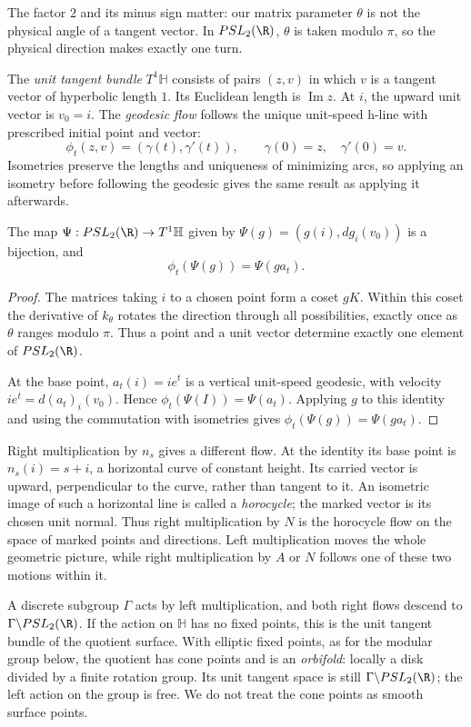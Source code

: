 The factor $2$ and its minus sign matter: our matrix parameter $\theta$ is not the physical angle of a tangent vector. In $PSL_2(\R)$, $\theta$ is taken modulo $\pi$, so the physical direction makes exactly one turn.

The \emph{unit tangent bundle} $T^1\mathbb H$ consists of pairs $(z,v)$ in which $v$ is a tangent vector of hyperbolic length $1$. Its Euclidean length is $\operatorname{Im}z$. At $i$, the upward unit vector is $v_0=i$. The \emph{geodesic flow} follows the unique unit-speed h-line with prescribed initial point and vector:
\[
\phi_t(z,v)=(\gamma(t),\gamma'(t)),\qquad \gamma(0)=z,\quad\gamma'(0)=v.
\]
Isometries preserve the lengths and uniqueness of minimizing arcs, so applying an isometry before following the geodesic gives the same result as applying it afterwards.

\begin{theorem}\label{thm:geodflow}
The map $\Psi:PSL_2(\R)\to T^1\mathbb H$ given by $\Psi(g)=(g(i),dg_i(v_0))$ is a bijection, and
\[
\phi_t(\Psi(g))=\Psi(ga_t).
\]
\end{theorem}

\begin{proof}
The matrices taking $i$ to a chosen point form a coset $gK$. Within this coset the derivative of $k_\theta$ rotates the direction through all possibilities, exactly once as $\theta$ ranges modulo $\pi$. Thus a point and a unit vector determine exactly one element of $PSL_2(\R)$.

At the base point, $a_t(i)=ie^t$ is a vertical unit-speed geodesic, with velocity $ie^t=d(a_t)_i(v_0)$. Hence $\phi_t(\Psi(I))=\Psi(a_t)$. Applying $g$ to this identity and using the commutation with isometries gives $\phi_t(\Psi(g))=\Psi(ga_t)$.
\end{proof}

Right multiplication by $n_s$ gives a different flow. At the identity its base point is $n_s(i)=s+i$, a horizontal curve of constant height. Its carried vector is upward, perpendicular to the curve, rather than tangent to it. An isometric image of such a horizontal line is called a \emph{horocycle}; the marked vector is its chosen unit normal. Thus right multiplication by $N$ is the horocycle flow on the space of marked points and directions. Left multiplication moves the whole geometric picture, while right multiplication by $A$ or $N$ follows one of these two motions within it.

A discrete subgroup $\Gamma$ acts by left multiplication, and both right flows descend to $\Gamma\backslash PSL_2(\R)$. If the action on $\mathbb H$ has no fixed points, this is the unit tangent bundle of the quotient surface. With elliptic fixed points, as for the modular group below, the quotient has cone points and is an \emph{orbifold}: locally a disk divided by a finite rotation group. Its unit tangent space is still $\Gamma\backslash PSL_2(\R)$; the left action on the group is free. We do not treat the cone points as smooth surface points.


